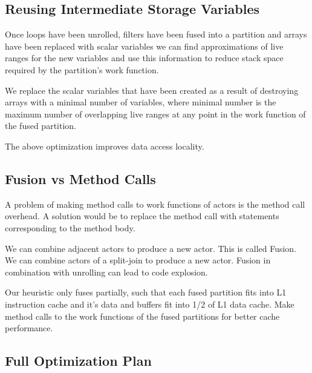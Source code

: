 \documentclass{sig-alternate}
\begin{document}
\subsection{Reusing Intermediate Storage Variables}

Once loops have been unrolled, filters have been fused
into a partition and arrays have been replaced with scalar
variables we can find approximations of live ranges for
the new variables and use this information to reduce stack
space required by the partition's work function.

We replace the scalar variables that have been created
as a result of destroying arrays with a minimal number
of variables, where minimal number is the maximum number 
of overlapping live ranges at any point in the work 
function of the fused partition.

The above optimization improves data access locality.

\subsection{Fusion vs Method Calls}

A problem of making method calls to work functions of actors
is the method call overhead.
A solution would be to replace the method call 
with statements corresponding to the method body.

We can combine adjacent actors to produce a new actor.
This is called Fusion.
We can combine actors of a split-join to produce a new actor.
Fusion in combination with unrolling can lead to code explosion.

Our heuristic only fuses partially, such that 
each fused partition fits into L1 instruction cache
and it's data and buffers fit into 1/2 of L1 data
cache. Make method calls to the work functions of 
the fused partitions for better cache performance.


\subsection{Full Optimization Plan}
\end{document}
